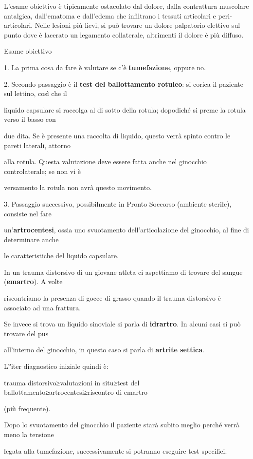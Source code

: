 \documentclass[]{article}
\begin{document}
L'esame obiettivo è tipicamente ostacolato dal dolore, dalla contrattura
muscolare antalgica, dall'ematoma e dall'edema che infiltrano i tessuti
articolari e peri-articolari. Nelle lesioni più lievi, si può trovare un
dolore palpatorio elettivo sul punto dove è lacerato un legamento
collaterale, altrimenti il dolore è più diffuso.

Esame obiettivo

1. La prima cosa da fare è valutare se c'è \textbf{tumefazione}, oppure
no.

2. Secondo passaggio è il \textbf{test del ballottamento rotuleo}: si
corica il paziente sul lettino, così che il

liquido capsulare si raccolga al di sotto della rotula; dopodiché si
preme la rotula verso il basso con

due dita. Se è presente una raccolta di liquido, questo verrà spinto
contro le pareti laterali, attorno

alla rotula. Questa valutazione deve essere fatta anche nel ginocchio
controlaterale; se non vi è

versamento la rotula non avrà questo movimento.

3. Passaggio successivo, possibilmente in Pronto Soccorso (ambiente
sterile), consiste nel fare

un'\textbf{artrocentesi}, ossia uno svuotamento dell'articolazione del
ginocchio, al fine di determinare anche

le caratteristiche del liquido capsulare.

In un trauma distorsivo di un giovane atleta ci aspettiamo di trovare
del sangue (\textbf{emartro}). A volte

riscontriamo la presenza di gocce di grasso quando il trauma distorsivo
è associato ad una frattura.

Se invece si trova un liquido sinoviale si parla di \textbf{idrartro}.
In alcuni casi si può trovare del pus

all'interno del ginocchio, in questo caso si parla di \textbf{artrite
settica}.

L‟iter diagnostico iniziale quindi è:

trauma distorsivo≥valutazioni in situ≥test del
ballottamento≥artrocentesi≥riscontro di emartro

(più frequente).

Dopo lo svuotamento del ginocchio il paziente starà subito meglio perché
verrà meno la tensione

legata alla tumefazione, successivamente si potranno eseguire test
specifici.
\end{document}
